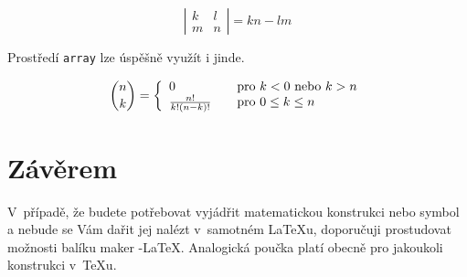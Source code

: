 \documentclass[11pt,a4paper,twocolumn]{article}
\begin{document}
$$\left|\begin{array}{cc}
k & l \\ 
m & n
\end{array}\right| = kn -lm$$

Prostředí \texttt{array} lze úspěšně využít i jinde.

$$\binom{n}{k} = \left\{ 
\begin{array}{l l}
0 & \quad \mbox{pro $k < 0$ nebo $k > n$}\\
\frac{n!}{k!(n-k)!} & \quad \mbox{pro $0 \leq k \leq n$}\\
\end{array} \right. $$

\section{Závěrem}
V~případě, že budete potřebovat vyjádřit matematickou konstrukci nebo symbol a nebude se Vám dařit jej nalézt v~samotném \LaTeX u, doporučuji prostudovat možnosti balíku maker \AmS-\LaTeX.
Analogická poučka platí obecně pro jakoukoli konstrukci v~\TeX u.
\end{document}
